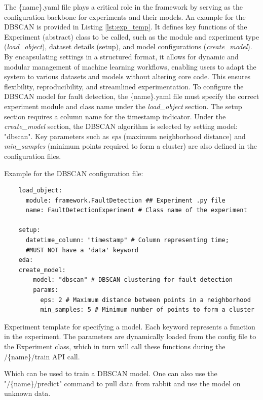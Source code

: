 \documentclass[preprint,12pt, a4paper]{elsarticle}
\begin{document}
The \{name\}.yaml file plays a critical role in the framework by serving as the configuration backbone for experiments and their models. An example for the DBSCAN is provided in Listing \ref{lst:exp_temp}. It defines key functions of the Experiment (abstract) class to be called, such as the module and experiment type (\textit{load\_object}), dataset details (setup), and model configurations (\textit{create\_model}). By encapsulating settings in a structured format, it allows for dynamic and modular management of machine learning workflows, enabling users to adapt the system to various datasets and models without altering core code. This ensures flexibility, reproducibility, and streamlined experimentation. To configure the DBSCAN model for fault detection, the \{name\}.yaml file must specify the correct experiment module and class name under the \textit{load\_object} section. The setup section requires a column name for the timestamp indicator. Under the \textit{create\_model} section, the DBSCAN algorithm is selected by setting model: "dbscan". Key parameters such as \textit{eps} (maximum neighborhood distance) and \textit{min\_samples} (minimum points required to form a cluster) are also defined in the configuration files.

Example for the DBSCAN configuration file:
\begin{listing}[ht]
\begin{verbatim}
    load_object:
      module: framework.FaultDetection ## Experiment .py file
      name: FaultDetectionExperiment # Class name of the experiment
    
    setup:
      datetime_column: "timestamp" # Column representing time;
      #MUST NOT have a 'data' keyword
    eda:
    create_model:
        model: "dbscan" # DBSCAN clustering for fault detection
        params:
          eps: 2 # Maximum distance between points in a neighborhood
          min_samples: 5 # Minimum number of points to form a cluster
\end{verbatim}
\caption{Experiment template for specifying a model. Each keyword represents a function in the experiment. The parameters are dynamically loaded from the config file to the Experiment class, which in turn will call these functions during the /\{name\}/train API call.}
\label{lst:exp_temp}
\end{listing}
Which can be used to train a DBSCAN model. One can also use the "/\{name\}/predict" command to pull data from rabbit and use the model on unknown data.
\end{document}
